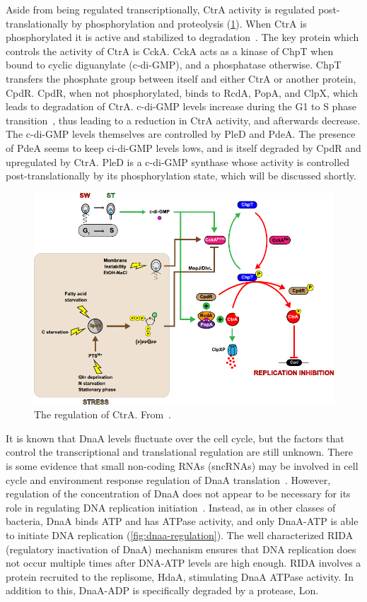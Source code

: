 Aside from being regulated transcriptionally, CtrA activity is regulated post-translationally by phosphorylation and proteolysis (\cref{fig:ctra-regulation}).
When CtrA is phosphorylated it is active and stabilized to degradation~\cite{frandi2019}.
The key protein which controls the activity of CtrA is CckA.
CckA acts as a kinase of ChpT when bound to cyclic diguanylate (c-di-GMP), and a phosphatase otherwise.
ChpT transfers the phosphate group between itself and either CtrA or another protein, CpdR.
CpdR, when not phosphorylated, binds to RcdA, PopA, and ClpX, which leads to degradation of CtrA.
c-di-GMP levels increase during the G1 to S phase transition~\cite{hallez2017}, thus leading to a reduction in CtrA activity, and afterwards decrease.
The c-di-GMP levels themselves are controlled by PleD and PdeA.
The presence of PdeA seems to keep ci-di-GMP levels lows, and is itself degraded by CpdR and upregulated by CtrA.
PleD is a c-di-GMP synthase whose activity is controlled post-translationally by its phosphorylation state, which will be discussed shortly.

\begin{figure}
    \centering
    \includegraphics{ctra-regulation}
    \caption{
        The regulation of CtrA.
        From~\cite{frandi2019}.
        \label{fig:ctra-regulation}
     }
\end{figure}

It is known that DnaA levels fluctuate over the cell cycle, but the factors that control the transcriptional and translational regulation are still unknown.
There is some evidence that small non-coding RNAs (sncRNAs) may be involved in cell cycle and environment response regulation of DnaA translation~\cite{felletti2019}.
However, regulation of the concentration of DnaA does not appear to be necessary for its role in regulating DNA replication initiation~\cite{jonas2011}.
Instead, as in other classes of bacteria, DnaA binds ATP and has ATPase activity, and only DnaA-ATP is able to initiate DNA replication (\cref{fig:dnaa-regulation}).
The well characterized RIDA (regulatory inactivation of DnaA) mechanism ensures that DNA replication does not occur multiple times after DNA-ATP levels are high enough.
RIDA involves a protein recruited to the replisome, HdaA, stimulating DnaA ATPase activity.
In addition to this, DnaA-ADP is specifically degraded by a protease, Lon.

